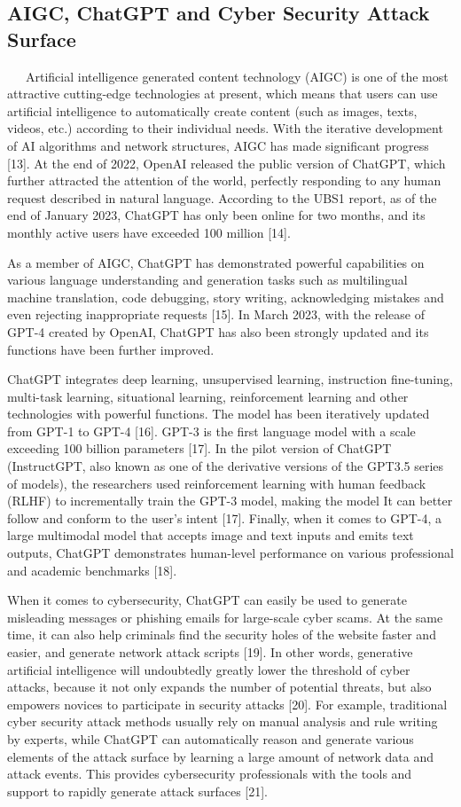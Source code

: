 \documentclass[runningheads]{llncs}
\begin{document}
\subsection{AIGC, ChatGPT and Cyber Security Attack Surface}
\ \ \ Artificial intelligence generated content technology (AIGC) is one of the most attractive cutting-edge technologies at present, which means that users can use artificial intelligence to automatically create content (such as images, texts, videos, etc.) according to their individual needs. With the iterative development of AI algorithms and network structures, AIGC has made significant progress [13]. At the end of 2022, OpenAI released the public version of ChatGPT, which further attracted the attention of the world, perfectly responding to any human request described in natural language. According to the UBS1 report, as of the end of January 2023, ChatGPT has only been online for two months, and its monthly active users have exceeded 100 million [14].\par
%
As a member of AIGC, ChatGPT has demonstrated powerful capabilities on various language understanding and generation tasks such as multilingual machine translation, code debugging, story writing, acknowledging mistakes and even rejecting inappropriate requests [15]. In March 2023, with the release of GPT-4 created by OpenAI, ChatGPT has also been strongly updated and its functions have been further improved.\par
%
ChatGPT integrates deep learning, unsupervised learning, instruction fine-tuning, multi-task learning, situational learning, reinforcement learning and other technologies with powerful functions. The model has been iteratively updated from GPT-1 to GPT-4 [16]. GPT-3 is the first language model with a scale exceeding 100 billion parameters [17]. In the pilot version of ChatGPT (InstructGPT, also known as one of the derivative versions of the GPT3.5 series of models), the researchers used reinforcement learning with human feedback (RLHF) to incrementally train the GPT-3 model, making the model It can better follow and conform to the user's intent [17]. Finally, when it comes to GPT-4, a large multimodal model that accepts image and text inputs and emits text outputs, ChatGPT demonstrates human-level performance on various professional and academic benchmarks [18].\par
%
When it comes to cybersecurity, ChatGPT can easily be used to generate misleading messages or phishing emails for large-scale cyber scams. At the same time, it can also help criminals find the security holes of the website faster and easier, and generate network attack scripts [19]. In other words, generative artificial intelligence will undoubtedly greatly lower the threshold of cyber attacks, because it not only expands the number of potential threats, but also empowers novices to participate in security attacks [20]. For example, traditional cyber security attack methods usually rely on manual analysis and rule writing by experts, while ChatGPT can automatically reason and generate various elements of the attack surface by learning a large amount of network data and attack events. This provides cybersecurity professionals with the tools and support to rapidly generate attack surfaces [21].\par
\end{document}
